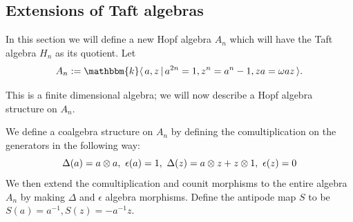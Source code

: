 \documentclass{amsart}
\theoremstyle{plain}%
\theoremstyle{remark}
\newcommand{\1}{\mathbbm{1}}
\begin{document}
    \subsection{Extensions of Taft algebras}

        In this section we will define a new Hopf algebra $A_n$ which will have the Taft algebra $H_{n}$ as its quotient.
        Let $$A_{n}:=\mathbbm{k}\langle \,a,z\,|\,a^{2n}=1, z^n=a^n-1, za=\omega az\,\rangle.$$
   
        This is a finite dimensional algebra; we will now describe a Hopf algebra structure on $A_{n}$. 
    
        We define a coalgebra structure on $A_{n}$ by defining the comultiplication on the generators in the following way:
        $$
            \Delta(a)=a\otimes a,~\epsilon(a)=1, \\
            ~\Delta(z) = a\otimes z +z\otimes 1,~ \epsilon(z)=0
        $$
        We then extend the comultiplication and counit morphisms to the entire algebra $A_{n}$ by making $\Delta$ and $\epsilon$ algebra morphisms. Define the antipode map $S$ to be $S(a)=a^{-1}, S(z) = -a^{-1}z$. 
\end{document}
